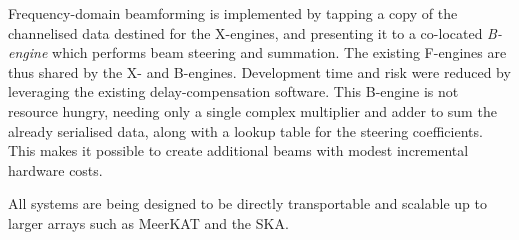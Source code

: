 Frequency-domain beamforming is implemented by tapping a copy of the
channelised data destined for the X-engines, and presenting it to a
co-located \textit{B-engine} which performs beam steering and
summation. The existing F-engines are thus shared by the X- and
B-engines. Development time and risk were reduced by leveraging the
existing delay-compensation software. This B-engine is not resource
hungry, needing only a single complex multiplier and adder to sum the
already serialised data, along with a lookup table for the steering
coefficients. This makes it possible to create additional beams with
modest incremental hardware costs.

All systems are being designed to be directly transportable and
scalable up to larger arrays such as MeerKAT and the SKA.
